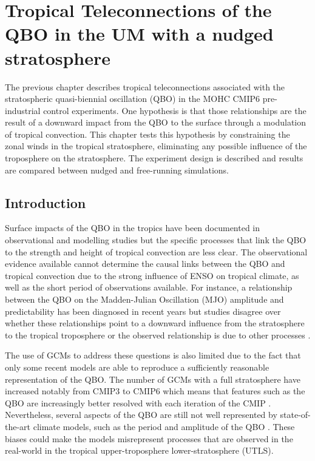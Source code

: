 \chapter{\label{ch:7-nudging} Tropical Teleconnections of the QBO in the UM with a nudged stratosphere }

The previous chapter describes tropical teleconnections associated with the stratospheric quasi-biennial oscillation (QBO) in the MOHC CMIP6 pre-industrial control experiments. One hypothesis is that those relationships are the result of a downward impact from the QBO to the surface through a modulation of tropical convection. 
This chapter tests this hypothesis by constraining the zonal winds in the tropical stratosphere, eliminating any possible influence of the troposphere on the stratosphere. 
The experiment design is described and results are compared between nudged and free-running simulations. %

\section{Introduction}

Surface impacts of the QBO in the tropics have been documented in observational and modelling studies \citep{giorgetta1999,collimore2003,garfinkel2010,liess2012,hansen2016tropospheric,gray2018,ma2021} but the specific processes that link the QBO to the strength and height of tropical convection are less clear. 
The observational evidence available \citep[e.g.][]{collimore2003,liess2012,gray2018} cannot determine the causal links between the QBO and tropical convection due to the strong influence of ENSO on tropical climate, as well as the short period of observations available.
For instance,  a relationship between the QBO on the Madden-Julian Oscillation (MJO) amplitude and predictability has been diagnosed in recent years \citep{son2017,wang2019,lim2019,klotzbach2019,densmore2019} but studies disagree over whether these relationships point to a downward influence from the stratosphere to the tropical troposphere \citep{klotzbach2019,lim2019} or the observed relationship is due to other processes \citep{wang2019}.

  The use of GCMs to address these questions is also limited due to the fact that only some recent models are able to reproduce a sufficiently reasonable representation of the QBO. The number of GCMs with a full stratosphere have increased notably from CMIP3 to CMIP6 which means that features such as the QBO are increasingly better resolved with each iteration of the CMIP \citep{bushell2020,richter2020}. Nevertheless, several aspects of the QBO are still not well represented by state-of-the-art climate models, such as the period and amplitude of the QBO \citep{schenzinger2017,richter2020}. 
These biases could make the models misrepresent processes that are observed in the real-world in the tropical upper-troposphere lower-stratosphere (UTLS).

